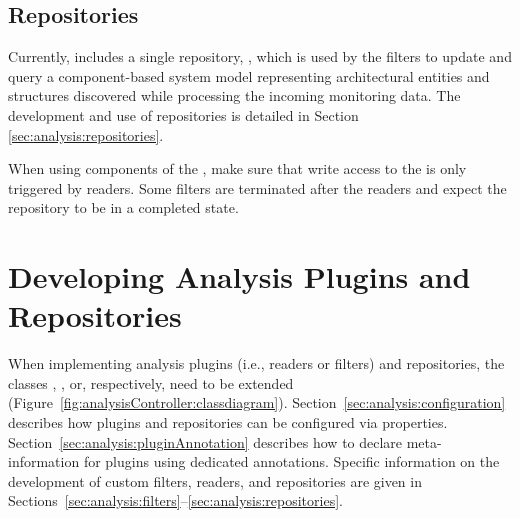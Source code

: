 %


\subsection{Repositories}

Currently, \Kieker{} includes a single repository, , %
which is used by the \KiekerTraceAnalysis{} filters to update and query %
a component-based system model representing architectural entities %
and structures discovered while processing the incoming monitoring data. %
The development and use of repositories is detailed in Section~%
\ref{sec:analysis:repositories}. %

When using components of the \KiekerTraceAnalysis{}, make sure that write access to the %
 is only triggered by readers. Some filters are terminated %
after the readers and expect the repository to be in a completed state.


\section{Developing Analysis Plugins and Repositories}\label{sec:analysis:plugins}

When implementing analysis plugins (i.e., readers or filters) and repositories, %
the classes , , or, %
respectively,  need to be extended %
(Figure~\ref{fig:analysisController:classdiagram}). %
Section~\ref{sec:analysis:configuration} describes how plugins and repositories %
can be configured via properties. %
Section~\ref{sec:analysis:pluginAnnotation} %
describes how to declare meta-information for plugins using %
dedicated annotations. %
Specific information on the development of custom filters, readers, and repositories %
are given in Sections~\ref{sec:analysis:filters}--\ref{sec:analysis:repositories}. %


